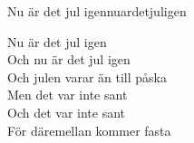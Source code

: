 \begin{song}{Nu är det jul igen}{nuardetjuligen}
\begin{vers}
\repopen Nu är det jul igen\\
Och nu är det jul igen\\
Och julen varar än till påska \repclose\\
\repopen Men det var inte sant\\
Och det var inte sant\\
För däremellan kommer fasta \repclose\\
\end{vers}
\end{song}
